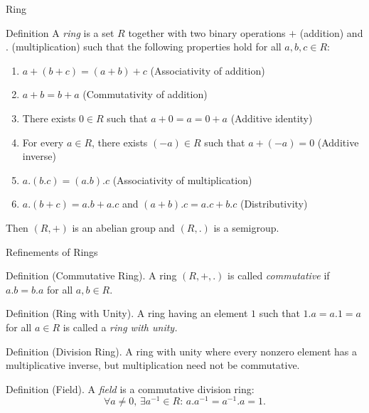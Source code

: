 \documentclass[11pt,aspectratio=43,ignorenonframetext,t]{beamer}
\begin{document}
\begin{frame}{Ring}
\begin{block}{Definition}  
A \emph{ring} is a set \(R\) together with two binary operations \(+\) (addition) and \(.\) (multiplication) such that the following properties hold for all \(a,b,c\in R\):

\begin{enumerate}
  \item \(a+(b+c) = (a+b)+c\) \hfill (Associativity of addition)
  \item \(a+b = b+a\) \hfill (Commutativity of addition)
  \item There exists \(0 \in R\) such that \(a+0=a=0+a\) \hfill (Additive identity)
  \item For every \(a\in R\), there exists \((-a)\in R\) such that \(a+(-a)=0\) \hfill (Additive inverse)
  \item \(a.(b.c)=(a.b).c\) \hfill (Associativity of multiplication)
  \item \(a.(b+c)=a.b+a.c\) and \((a+b).c=a.c+b.c\) \hfill (Distributivity)
\end{enumerate}

Then \((R,+)\) is an abelian group and \((R,.)\) is a semigroup.
\end{block}
\end{frame}

\begin{frame}{Refinements of Rings}
\vspace{-0.3cm}
\begin{block}{Definition (Commutative Ring).}  
A ring \((R,+,.)\) is called \emph{commutative} if \(a.b=b.a\) for all \(a,b\in R.\)
\end{block}
\vspace{-0.3cm}
\begin{block}{Definition (Ring with Unity).}  
A ring having an element \(1\) such that \(1.a=a.1=a\) for all \(a\in R\) is called a \emph{ring with unity.}
\end{block}
\vspace{-0.3cm}
\begin{block}{Definition (Division Ring).}  
A ring with unity where every nonzero element has a multiplicative inverse, but multiplication need not be commutative.
\end{block}
\vspace{-0.3cm}
\begin{block}{Definition (Field).}  
A \emph{field} is a commutative division ring:  
\[
\forall a\neq0,\,\exists a^{-1}\in R:\,a.a^{-1}=a^{-1}.a=1.
\]
\end{block}
\end{frame}
\end{document}
